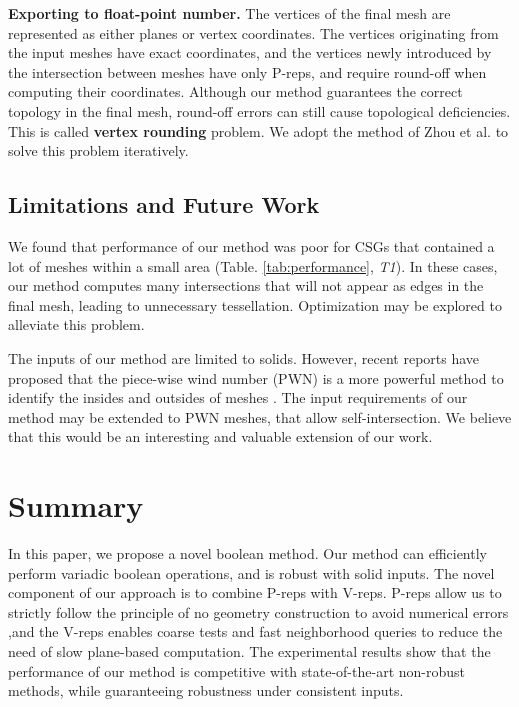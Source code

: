 \vspace{0.5em}
\noindent\textbf{Exporting to float-point number. }
The vertices of the final mesh are represented as either planes or vertex coordinates. The vertices originating from the input meshes have exact coordinates, and the vertices newly introduced by the intersection between meshes have only P-reps, and require round-off when computing their coordinates. Although our method guarantees the correct topology in the final mesh, round-off errors can still cause topological deficiencies. This is called \textbf{vertex rounding} problem. We adopt the method of Zhou et al. \cite{zhou2016mesh} to solve this problem iteratively.

\subsection{Limitations and Future Work}

We found that performance of our method was poor for CSGs that contained a lot of meshes within a small area (Table. \ref{tab:performance}, \emph{T1}). In these cases, our method computes many intersections that will not appear as edges in the final mesh, leading to unnecessary tessellation. Optimization may be explored to alleviate this problem.

The inputs of our method are limited to solids. However, recent reports have proposed that the piece-wise wind number (PWN) is a more powerful method to identify the insides and outsides of meshes \cite{zhou2016mesh}. The input requirements of our method may be extended to PWN meshes, that allow self-intersection. We believe that this would be an interesting and valuable extension of our work.

\section{Summary}

In this paper, we propose a novel boolean method. Our method can efficiently perform variadic boolean operations, and is robust with solid inputs. The novel component of our approach is to combine P-reps with V-reps. P-reps allow us to strictly follow the principle of no geometry construction to avoid numerical errors ,and the V-reps enables coarse tests and fast neighborhood queries to reduce the need of slow plane-based computation. The experimental results show that the performance of our method is competitive with state-of-the-art non-robust methods, while guaranteeing robustness under consistent inputs.
